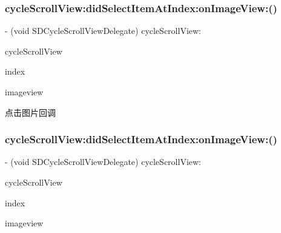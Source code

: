 \subsubsection{\texorpdfstring{cycle\+Scroll\+View\+:did\+Select\+Item\+At\+Index\+:on\+Image\+View\+:()}{cycleScrollView:didSelectItemAtIndex:onImageView:()}\hspace{0.1cm}{\footnotesize\ttfamily [1/3]}}
{\footnotesize\ttfamily -\/ (void S\+D\+Cycle\+Scroll\+View\+Delegate) cycle\+Scroll\+View\+: \begin{DoxyParamCaption}\item[{(\mbox{\hyperlink{interface_s_d_cycle_scroll_view}{S\+D\+Cycle\+Scroll\+View}} $\ast$)}]{cycle\+Scroll\+View }\item[{didSelectItemAtIndex:(N\+S\+Integer)}]{index }\item[{onImageView:(U\+I\+Image\+View $\ast$)}]{imageview }\end{DoxyParamCaption}\hspace{0.3cm}{\ttfamily [optional]}}

点击图片回调 \mbox{\label{protocol_s_d_cycle_scroll_view_delegate_01-p_ad67d8b19b0b2353ba188db5f969e4c3e}} 
\subsubsection{\texorpdfstring{cycle\+Scroll\+View\+:did\+Select\+Item\+At\+Index\+:on\+Image\+View\+:()}{cycleScrollView:didSelectItemAtIndex:onImageView:()}\hspace{0.1cm}{\footnotesize\ttfamily [2/3]}}
{\footnotesize\ttfamily -\/ (void S\+D\+Cycle\+Scroll\+View\+Delegate) cycle\+Scroll\+View\+: \begin{DoxyParamCaption}\item[{(\mbox{\hyperlink{interface_s_d_cycle_scroll_view}{S\+D\+Cycle\+Scroll\+View}} $\ast$)}]{cycle\+Scroll\+View }\item[{didSelectItemAtIndex:(N\+S\+Integer)}]{index }\item[{onImageView:(U\+I\+Image\+View $\ast$)}]{imageview }\end{DoxyParamCaption}\hspace{0.3cm}{\ttfamily [optional]}}

